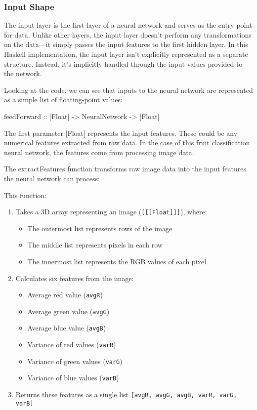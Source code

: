 \documentclass[12pt,a4paper]{article}
\begin{document}
\subsubsection{Input Shape}
The input layer is the first layer of a neural network and serves as the entry point for data. Unlike other layers, the input layer doesn't perform any transformations on the data—it simply passes the input features to the first hidden layer.
In this Haskell implementation, the input layer isn't explicitly represented as a separate structure. Instead, it's implicitly handled through the input values provided to the network.

Looking at the code, we can see that inputs to the neural network are represented as a simple list of floating-point values:\\

\begin{code}
feedForward :: [Float] -> NeuralNetwork -> [Float]
\end{code}

The first parameter [Float] represents the input features. These could be any numerical features extracted from raw data. In the case of this fruit classification neural network, the features come from processing image data.

The extractFeatures function transforms raw image data into the input features the neural network can process:

% 

This function:
\begin{enumerate}
  \item Takes a 3D array representing an image (\texttt{[[[Float]]]}), where:
  \begin{itemize}
    \item The outermost list represents rows of the image
    \item The middle list represents pixels in each row
    \item The innermost list represents the RGB values of each pixel
  \end{itemize}
  
  \item Calculates six features from the image:
  \begin{itemize}
    \item Average red value (\texttt{avgR})
    \item Average green value (\texttt{avgG})
    \item Average blue value (\texttt{avgB})
    \item Variance of red values (\texttt{varR})
    \item Variance of green values (\texttt{varG})
    \item Variance of blue values (\texttt{varB})
  \end{itemize}
  
  \item Returns these features as a single list \texttt{[avgR, avgG, avgB, varR, varG, varB]}
\end{enumerate}
\end{document}
